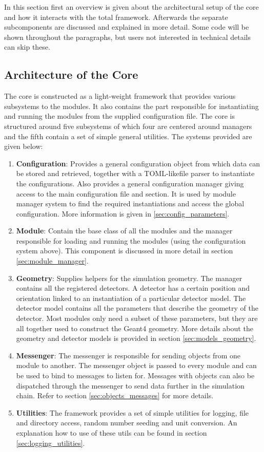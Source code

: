 In this section first an overview is given about the architectural setup of the core and how it interacts with the total \apsq framework. Afterwards the separate subcomponents are discussed and explained in more detail. Some code will be shown throughout the paragraphs, but users not interested in technical details can skip these.

\subsection{Architecture of the Core}
The core is constructed as a light-weight framework that provides various subsystems to the modules. It also contains the part responsible for instantiating and running the modules from the supplied configuration file. The core is structured around five subsystems of which four are centered around managers and the fifth contain a set of simple general utilities. The systems provided are given below:
\begin{enumerate}
\item \textbf{Configuration}: Provides a general configuration object from which data can be stored and retrieved, together with a TOML-like\needref file parser to instantiate the configurations. Also provides a general \apsq configuration manager giving access to the main configuration file and section. It is used by module manager system to find the required instantiations and access the global configuration. More information is given in \ref{sec:config_parameters}.
\item \textbf{Module}: Contain the base class of all the \apsq modules and the manager responsible for loading and running the modules (using the configuration system above). This component is discussed in more detail in section \ref{sec:module_manager}.
\item \textbf{Geometry}: Supplies helpers for the simulation geometry. The manager contains all the registered detectors. A detector has a certain position and orientation linked to an instantiation of a particular detector model. The detector model contains all the parameters that describe the geometry of the detector. Most modules only need a subset of these parameters, but they are all together used to construct the Geant4 geometry. More details about the geometry and detector models is provided in section \ref{sec:models_geometry}.
\item \textbf{Messenger}: The messenger is responsible for sending objects from one module to another. The messenger object is passed to every module and can be used to bind to messages to listen for. Messages with objects can also be dispatched through the messenger to send data further in the simulation chain. Refer to section \ref{sec:objects_messages} for more details.
\item \textbf{Utilities}: The framework provides a set of simple utilities for logging, file and directory access, random number seeding and unit conversion. An explanation how to use of these utils can be found in section \ref{sec:logging_utilities}. 
\end{enumerate}

